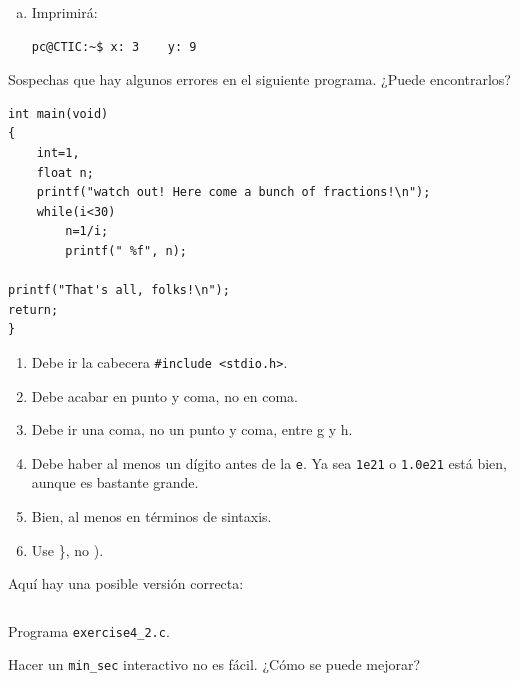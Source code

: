 \documentclass[spanish,addpoints,answers,a4paper]{exam}
\begin{document}
\begin{questions}
\begin{solution}
\begin{multicols}{2}
\begin{enumerate}[(a)]
\item Imprimirá:

\begin{verbatim}
pc@CTIC:~$ x: 3    y: 9
\end{verbatim}

\end{enumerate}
\end{multicols}

\end{solution}

\question Sospechas que hay algunos errores en el siguiente programa. ¿Puede encontrarlos?

\begin{verbatim}
int main(void)
{
	int=1,
	float n;
	printf("watch out! Here come a bunch of fractions!\n");
	while(i<30)
		n=1/i;
		printf(" %f", n);
		
printf("That's all, folks!\n");
return;
}
\end{verbatim}

\begin{solution}
\begin{enumerate}[label={Línea \arabic*:},leftmargin=1.2cm]
	\item Debe ir la cabecera \texttt{#include <stdio.h>}.\setcounter{enumi}{2}

	\item Debe acabar en punto y coma, no en coma.
	
	\item Debe ir una coma, no un punto y coma, entre g y h.
	
	\item Debe haber al menos un dígito antes de la \texttt{e}. Ya sea \texttt{1e21} o \texttt{1.0e21} está bien, aunque es bastante grande.
	
	\item Bien, al menos en términos de sintaxis.
	
	\item Use \}, no ).
\end{enumerate}

Aquí hay una posible versión correcta:

\begin{listing}[H]
	\footnotesize
	\inputminted{c}{exercise4_2.c}
	\caption{Programa \texttt{exercise4\_2.c}.}
	\label{lst:4.2}
\end{listing}
\end{solution}

\question Hacer un \texttt{min_sec} interactivo no es fácil. ¿Cómo se puede mejorar?


\end{questions}
\end{document}
